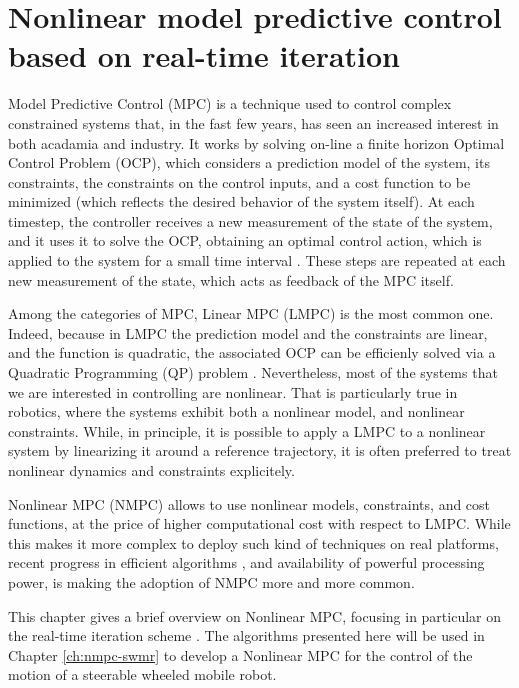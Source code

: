 \chapter{Nonlinear model predictive control based on real-time iteration}
\label{ch:nmpc-rti}
Model Predictive Control (MPC) is a technique used to control complex 
constrained systems that, in the fast few years, has seen an increased
interest in both acadamia and industry. It works by solving on-line a
finite horizon Optimal Control Problem (OCP), which considers a prediction 
model of the system, its constraints, the constraints on the
control inputs, and a cost function to be minimized (which reflects the
desired behavior of the system itself).
At each timestep, the controller receives a new measurement of the state of 
the system, and it uses it to solve the OCP, obtaining an optimal control action,
which is applied to the system for a small time interval
\cite{Mayne2014MPCAutomatica}. These steps are repeated at each new measurement 
of the state, which acts as feedback of the MPC itself.

Among the categories of MPC, Linear MPC (LMPC) is the most common one.
Indeed, because in LMPC the prediction model and the constraints are linear,
and the function is quadratic, the associated OCP can be efficienly solved
via a Quadratic Programming (QP) problem \cite{Gros2020Fromlineartononlinear}. 
Nevertheless, most of the systems that we are interested in controlling are 
nonlinear. That is particularly true in robotics, where the systems exhibit
both a nonlinear model, and nonlinear constraints. While, in principle, it is 
possible to apply a LMPC to a nonlinear system by linearizing it around a 
reference trajectory, it is often preferred to treat nonlinear dynamics and 
constraints explicitely.

Nonlinear MPC (NMPC) \cite{Diehl2009EfficientNumericalMethodsNMPC} allows to use 
nonlinear models, constraints, and cost functions, at the price of higher 
computational cost with respect to LMPC. While this makes it more complex to 
deploy such kind of techniques on real platforms, recent progress in efficient
algorithms \cite{Diehl2005RTI}, and availability of powerful processing power,
is making the adoption of NMPC more and more common.

This chapter gives a brief overview on Nonlinear MPC, focusing in particular on
the real-time iteration scheme \cite{Gros2020Fromlineartononlinear}. The 
algorithms presented here will be used in Chapter \ref{ch:nmpc-swmr} to develop 
a Nonlinear MPC for the control of the motion of a steerable wheeled mobile 
robot.

